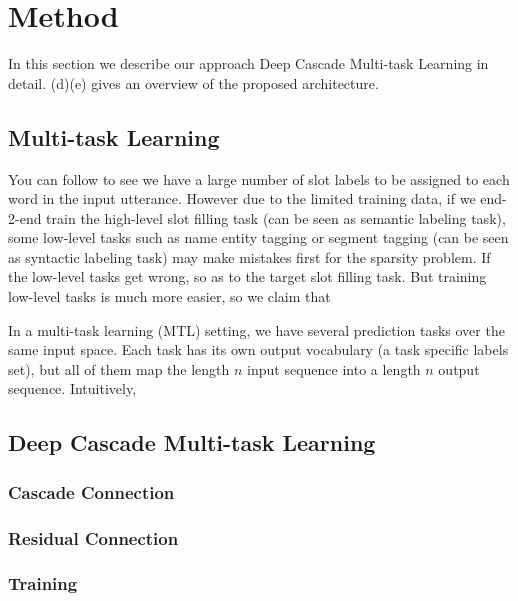 \section{Method}
\label{sec:model}

In this section we describe our approach Deep Cascade Multi-task Learning in detail.
(d)(e) gives an overview of the proposed architecture.

\begin{figure*}[h]
	\centering
	\caption{}
	\label{fig:model}
	\vspace{-10pt}
\end{figure*}

\subsection{Multi-task Learning}
You can follow  to see we have a large number of slot labels
to be assigned to each word in the input utterance.
However due to the limited training data,
if we end-2-end train the high-level slot filling task (can be seen as semantic labeling task),
some low-level tasks such as name entity tagging or segment tagging (can be seen as syntactic labeling task)
may make mistakes first for the sparsity problem.
If the low-level tasks get wrong, so as to the target slot filling task.
But training low-level tasks is much more easier,
so we claim that 

In a multi-task learning (MTL) setting, we have several prediction tasks over the same input space.
Each task has its own output vocabulary (a task specific labels set),
but all of them map the length $n$ input sequence into a length $n$ output sequence.
Intuitively, 

\subsection{Deep Cascade Multi-task Learning}

\subsubsection{Cascade Connection}

\subsubsection{Residual Connection}

\subsubsection{Training}